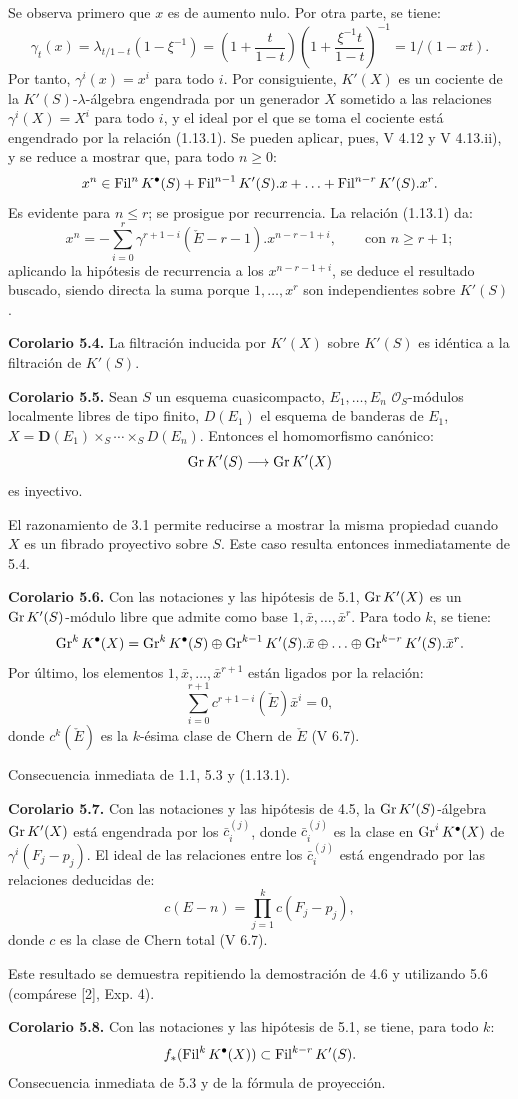 Se observa primero que $x$ es de aumento nulo. Por otra parte, se tiene:
\[
  \gamma_t(x)=\lambda_{t/1-t}(1-\xi^{-1})
  =\left(1+\frac{t}{1-t}\right)\left(1+\frac{\xi^{-1}t}{1-t}\right)^{-1}
  =1/(1-xt) .
\]
Por tanto, $\gamma^i(x)=x^i$ para todo $i$. Por consiguiente, $K'(X)$ es un cociente de la $K'(S)$-$\lambda$-álgebra engendrada por un generador $X$ sometido a las relaciones $\gamma^i(X)=X^i$ para todo $i$, y el ideal por el que se toma el cociente está engendrado por la relación (1.13.1). Se pueden aplicar, pues, V 4.12 y V 4.13.ii), y se reduce a mostrar que, para todo $n\ge 0$:
\[
  x^n\in \operatorname{Fil}^nK^{\bullet}(S)+\operatorname{Fil}^{n-1}K'(S).x+\ldots+\operatorname{Fil}^{n-r}K'(S).x^r .
\]
Es evidente para $n\le r$; se prosigue por recurrencia. La relación (1.13.1) da:
\[
  x^n=-\sum_{i=0}^{r}\gamma^{r+1-i}(\check E-r-1).x^{n-r-1+i},\qquad \text{con } n\ge r+1;
\]
aplicando la hipótesis de recurrencia a los $x^{n-r-1+i}$, se deduce el resultado buscado, siendo directa la suma porque $1,\ldots,x^r$ son independientes sobre $K'(S)$.

\textbf{Corolario 5.4.} La filtración inducida por $K'(X)$ sobre $K'(S)$ es idéntica a la filtración de $K'(S)$.

\textbf{Corolario 5.5.} Sean $S$ un esquema cuasicompacto, $E_1,\ldots,E_n$ $\mathcal O_S$-módulos localmente libres de tipo finito, $D(E_1)$ el esquema de banderas de $E_1$, $X=\mathbf D(E_1)\times_S\cdots\times_S D(E_n)$. Entonces el homomorfismo canónico:
\[
  \operatorname{Gr} K'(S)\longrightarrow \operatorname{Gr} K'(X)
\]
es inyectivo.

El razonamiento de 3.1 permite reducirse a mostrar la misma propiedad cuando $X$ es un fibrado proyectivo sobre $S$. Este caso resulta entonces inmediatamente de 5.4.

\textbf{Corolario 5.6.} Con las notaciones y las hipótesis de 5.1, $\operatorname{Gr} K'(X)$ es un $\operatorname{Gr} K'(S)$-módulo libre que admite como base $1,\bar x,\ldots,\bar x^r$. Para todo $k$, se tiene:
\[
  \operatorname{Gr}^kK^{\bullet}(X)=\operatorname{Gr}^kK^{\bullet}(S)\oplus \operatorname{Gr}^{k-1}K'(S).\bar x\oplus\ldots\oplus \operatorname{Gr}^{k-r}K'(S).\bar x^r .
\]
Por último, los elementos $1,\bar x,\ldots,\bar x^{r+1}$ están ligados por la relación:
\[
  \sum_{i=0}^{r+1}c^{r+1-i}(\check E)\bar x^i=0,
\]
donde $c^k(\check E)$ es la $k$-ésima clase de Chern de $\check E$ (V 6.7).

Consecuencia inmediata de 1.1, 5.3 y (1.13.1).

\textbf{Corolario 5.7.} Con las notaciones y las hipótesis de 4.5, la $\operatorname{Gr} K'(S)$-álgebra $\operatorname{Gr} K'(X)$ está engendrada por los $\bar c_i^{(j)}$, donde $\bar c_i^{(j)}$ es la clase en $\operatorname{Gr}^iK^{\bullet}(X)$ de $\gamma^i(F_j-p_j)$. El ideal de las relaciones entre los $\bar c_i^{(j)}$ está engendrado por las relaciones deducidas de:
\[
  c(E-n)=\prod_{j=1}^{k}c(F_j-p_j),
\]
donde $c$ es la clase de Chern total (V 6.7).

Este resultado se demuestra repitiendo la demostración de 4.6 y utilizando 5.6 (compárese [2], Exp. 4).

\textbf{Corolario 5.8.} Con las notaciones y las hipótesis de 5.1, se tiene, para todo $k$:
\[
  f_*(\operatorname{Fil}^kK^{\bullet}(X))\subset \operatorname{Fil}^{k-r}K'(S).
\]
Consecuencia inmediata de 5.3 y de la fórmula de proyección.

